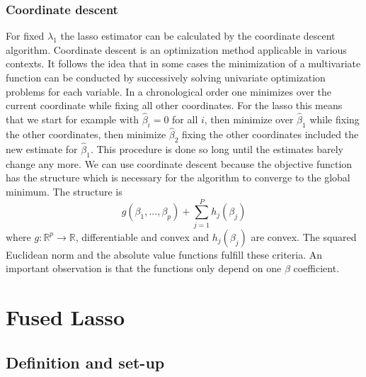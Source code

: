 \documentclass{article}
\theoremstyle{definition}
\begin{document}
%
%
\subsubsection{Coordinate descent} \label{Sec: Coordinate Lasso}
For fixed $\lambda_1$ the lasso estimator can be calculated by the coordinate descent algorithm.
Coordinate descent is an optimization method applicable in various contexts. It follows the idea that in some cases the minimization of a multivariate function can be conducted by successively solving univariate optimization problems for each variable. In a chronological order one minimizes over the current coordinate while fixing all other coordinates. For the lasso this means that we start for example with $\hat{\beta}_i =0$ for all $i$, then minimize over $\hat{\beta}_1$ while fixing the other coordinates, then minimize $\hat{\beta}_2$ fixing the other coordinates included the new estimate for $\hat{\beta}_1$. This procedure is done so long until the estimates barely change any more.
We can use coordinate descent because the objective function has the structure which is necessary for the algorithm to converge to the global minimum. The structure is
\begin{equation}
g(\beta_1,...,\beta_p)+\sum_{j=1}^Ph_j(\beta_j) \nonumber
\end{equation}
where $g: \mathbb{R}^p \to \mathbb{R}$, differentiable and convex and $h_j(\beta_j)$ are convex. The squared Euclidean norm and the absolute value functions fulfill these criteria. An important observation is that the functions only depend on one $\beta$ coefficient.
\cite[chapter 5]{sparsity}

\section{Fused Lasso}
\subsection{Definition and set-up}
\end{document}
